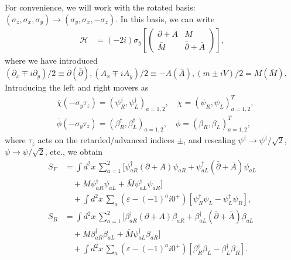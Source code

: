 \documentclass[aps,pra,reprint,superscriptaddress,showkeys,amsmath,amssymb,longbibliography]{revtex4-1}
\begin{document}
For convenience, we will work with the rotated basis: $(\sigma_z, \sigma_x, \sigma_y) \to (\sigma_y, \sigma_x, -\sigma_z)$.
In this basis, we can write 
\begin{align}
  \mathcal{H} &= (-2i) \sigma_y \left[ \left(
    \begin{array}{cc}
       \partial +  A &                      M \\
       \bar{M}       & \bar{\partial} +\bar{A}
    \end{array}
    \right) \right],
\end{align}
where we have introduced $(\partial_{x}\mp i \partial_y)/2 \equiv \partial (\bar{\partial}), (A_x \mp i A_y)/2 \equiv  - A (\bar{A}), (m\pm i V)/2 = M(\bar{M})$.
Introducing the left and right movers as
\begin{align}
  &
  \bar{\chi} (-\sigma_y\tau_z)
  = (\psi^{\dag}_{R},\psi^{\dag}_L)_{a=1,2},
   \quad
  \chi =
         (\psi^{\ }_{R},\psi^{\ }_L)^T_{a=1,2},
    \nonumber \\
    &
  \bar{\phi} (-\sigma_y\tau_z)
  = (\beta^{\dag}_{R},\beta^{\dag}_L)_{a=1,2},
   \quad
  \phi =
         (\beta^{\ }_{R},\beta^{\ }_L)^T_{a=1,2},
\end{align}
where $\tau_z$ acts on the retarded/advanced indices $\pm$, and rescaling $\psi^{\dag}\to \psi^{\dag}/\sqrt{2}$, $\psi\to \psi/\sqrt{2}$, etc., we obtain
\begin{align}
  \label{susy action}
  S_F  &=
     \int d^2x\, 
      \sum_{a=1}^2
    \Big[
     \psi^{\dag}_{aR}(\partial + A) \psi^{\ }_{aR}
    +
     \psi^{\dag}_{aL}(\bar{\partial}+\bar{A}) \psi^{\ }_{aL}
    \nonumber \\
  &\quad
    +
    M \psi^{\dag}_{aR} \psi^{\ }_{aL}
    +
    \bar{M}
     \psi^{\dag}_{aL} \psi^{\ }_{aR}
    \Big]
    \nonumber \\
  &\quad
    +
    \int d^2x\,
    \sum_{a} (\varepsilon - (-1)^a i 0^+)
    \left[
    \psi^{\dag}_R \psi^{\ }_L - \psi^{\dag}_L \psi^{\ }_R
    \right],
    \nonumber \\
    S_B  &=
     \int d^2x\, 
      \sum_{a=1}^2
    \Big[
     \beta^{\dag}_{aR}(\partial + A) \beta^{\ }_{aR}
    +
     \beta^{\dag}_{aL}(\bar{\partial}+\bar{A}) \beta^{\ }_{aL}
    \nonumber \\
  &\quad
    +
    M \beta^{\dag}_{aR} \beta^{\ }_{aL}
    +
    \bar{M}
     \psi^{\dag}_{aL} \beta^{\ }_{aR}
    \Big]
    \nonumber \\
  &\quad
    +
    \int d^2x\,
    \sum_{a} (\varepsilon - (-1)^a i0^+)
    \left[
    \beta^{\dag}_R \beta^{\ }_L - \beta^{\dag}_L \beta^{\ }_R
    \right].
\end{align}
\end{document}
